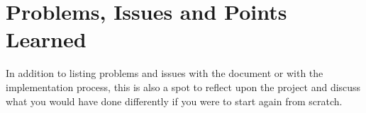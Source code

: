 \chapter{Problems, Issues and Points Learned}

In addition to listing problems and issues with the document or with the implementation process, this is also a spot to reflect upon the project and discuss what you would have done differently if you were to start again from scratch.